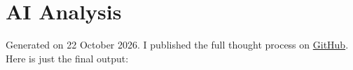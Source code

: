 \section{AI Analysis}
Generated on 22 October 2026.
I published the full thought process on \href{https://github.com/linusemr618/ucd_hist_ai_analysis/blob/main/ollama/qwen3_5_9b_2_full.txt}{GitHub}.
Here is just the final output:
